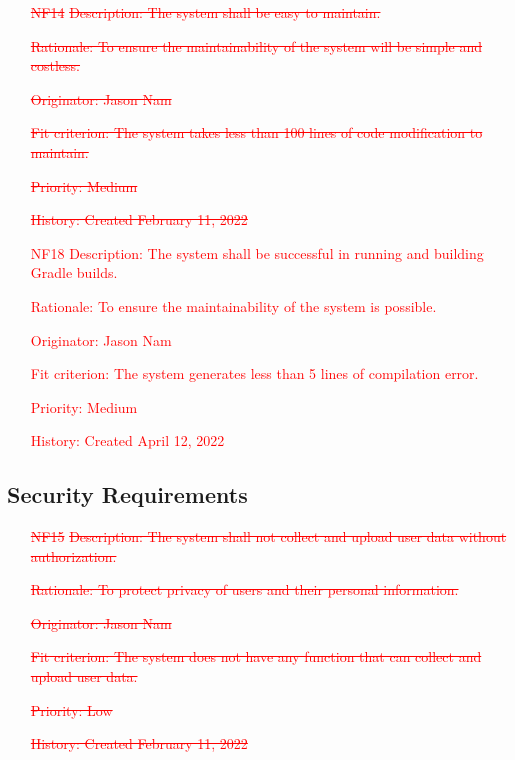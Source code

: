 \documentclass[12pt, titlepage]{article}
\begin{document}
\begin{itemize}
    \item[\textcolor{red}{\st{NF14}}]
\textcolor{red}{\st{Description: The system shall be easy to maintain.}}

\textcolor{red}{\st{Rationale: To ensure the maintainability of the system will be simple and costless.}}

\textcolor{red}{\st{Originator: Jason Nam}}

\textcolor{red}{\st{Fit criterion: The system takes less than 100 lines of code modification to maintain.}}

\textcolor{red}{\st{Priority: Medium}}

\textcolor{red}{\st{History: Created February 11, 2022}}

\item[\textcolor{red}{NF18}]
\textcolor{red}{Description: The system shall be successful in running and building Gradle builds.}

\textcolor{red}{Rationale: To ensure the maintainability of the system is possible.}

\textcolor{red}{Originator: Jason Nam}

\textcolor{red}{Fit criterion: The system generates less than 5 lines of compilation error.}

\textcolor{red}{Priority: Medium}

\textcolor{red}{History: Created April 12, 2022}

\end{itemize}

\subsection{Security Requirements}

\begin{itemize}
    \item[\textcolor{red}{\st{NF15}}]
\textcolor{red}{\st{Description: The system shall not collect and upload user data without authorization.}}

\textcolor{red}{\st{Rationale: To protect privacy of users and their personal information.}}

\textcolor{red}{\st{Originator: Jason Nam}}

\textcolor{red}{\st{Fit criterion: The system does not have any function that can collect and upload user data.}}

\textcolor{red}{\st{Priority: Low}}

\textcolor{red}{\st{History: Created February 11, 2022}}

\end{itemize}
\end{document}
